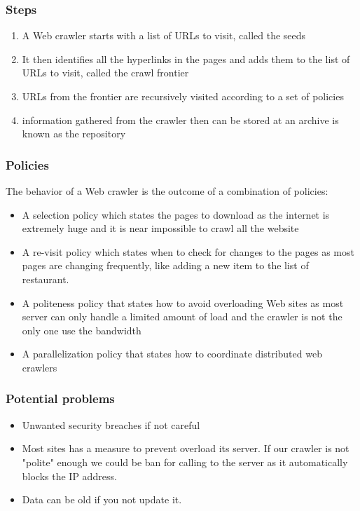 \documentclass[11pt,a4paper]{report}
\begin{document}
		\subsubsection{Steps}
		\begin{enumerate}
			\item A Web crawler starts with a list of URLs to visit, called the seeds
			\item It then identifies all the hyperlinks in the pages and adds them to the list of URLs to visit, called the crawl frontier
			\item URLs from the frontier are recursively visited according to a set of policies
			\item information gathered from the crawler then can be stored at an archive is known as the repository
		\end{enumerate}
		\subsubsection{Policies}
			The behavior of a Web crawler is the outcome of a combination of policies:
		\begin{itemize}
			\item A selection policy which states the pages to download as the internet is extremely huge and it is near impossible to crawl all the website
			\item A re-visit policy which states when to check for changes to the pages as most pages are changing frequently, like adding a new item to the list of restaurant.
			\item A politeness policy that states how to avoid overloading Web sites as most server can only handle a limited amount of load and the crawler is not the only one use the bandwidth
			\item A parallelization policy that states how to coordinate distributed web crawlers
		\end{itemize}
		\subsubsection{Potential problems}
		\begin{itemize}
			\item Unwanted security breaches if not careful
			\item Most sites has a measure to prevent overload its server. If our crawler is not "polite" enough we could be ban for calling to the server as it automatically blocks the IP address.
			\item Data can be old if you not update it.
		\end{itemize}
\end{document}
